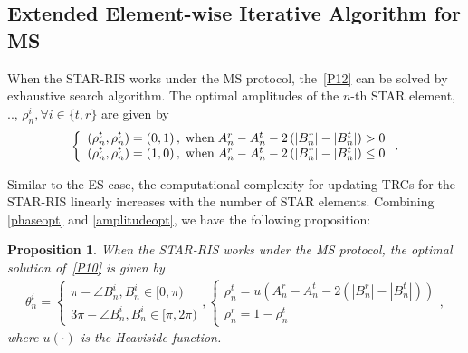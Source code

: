 \documentclass[12pt, draftclsnofoot, onecolumn]{IEEEtran}
\newcommand{\ie}{\text{i}.\text{e}.}
\newtheorem{proposition}{Proposition}
\begin{document}
\subsection{Extended Element-wise Iterative Algorithm for MS}
When the STAR-RIS works under the MS protocol, the~\eqref{P12} can be solved by exhaustive search algorithm. The optimal amplitudes of the $n$-th STAR element, \ie, $\rho_n^i, \forall i \in \{t,r\}$ are given by
\begin{equation}\label{amplitudeopt}
\begin{aligned}
\left\{ {\begin{array}{*{20}{c}}
{\left( {\rho _n^t,\rho _n^t} \right) = \left( {0,1} \right),\;{\rm{when}}\;A_n^r - A_n^t - 2\left( {\left| {B_n^r} \right| - \left| {B_n^t} \right|} \right) > 0}\\
{\left( {\rho _n^t,\rho _n^t} \right) = \left( {1,0} \right),\;{\rm{when}}\;A_n^r - A_n^t - 2\left( {\left| {B_n^r} \right| - \left| {B_n^t} \right|} \right) \le 0}
\end{array}} \right..
\end{aligned}
\end{equation} 

Similar to the ES case, the computational complexity for updating TRCs for the STAR-RIS linearly increases with the number of STAR elements. Combining \eqref{phaseopt} and \eqref{amplitudeopt}, we have the following proposition:
\begin{proposition}\label{proposition2}
\emph{When the STAR-RIS works under the MS protocol, the optimal solution of}~\eqref{P10} \emph{is given by}
\begin{equation}\label{MSphase}
\begin{aligned}
\theta _n^i = \left\{ {\begin{array}{*{20}{l}}
{\pi  - \angle B_n^i, B_n^i \in[0,\pi)}\\
{3\pi  - \angle B_n^i, B_n^i \in[\pi,2\pi)}
\end{array}} \right., \left\{ {\begin{array}{*{20}{l}}
{\rho _n^t = u\left(A_n^r-A_n^t-2\left(\left|B_n^r\right|-\left|B_n^t\right|\right)\right)}\\
{\rho _n^r = 1-\rho _n^t}
\end{array}} \right.,
\end{aligned}
\end{equation}
\emph{where} $u\left(\cdot\right)$ \emph{is the Heaviside function.}\vspace{-0.2cm}
\end{proposition}
\end{document}
